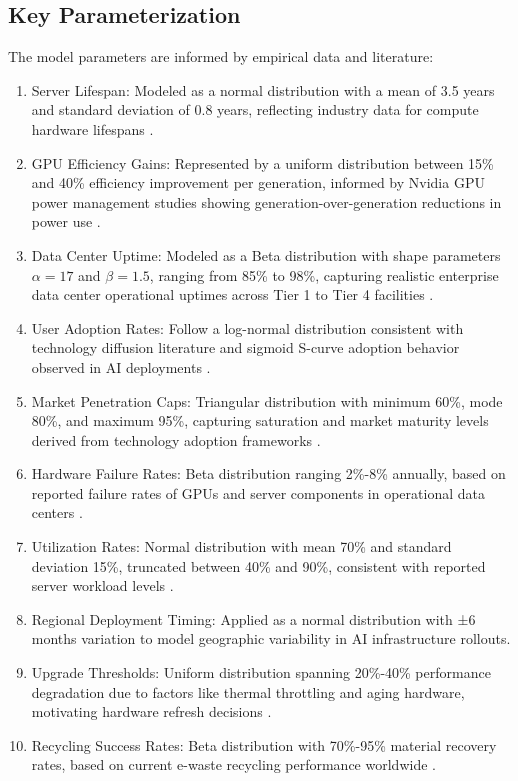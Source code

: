 \documentclass[a4paper, 12pt]{article}
\begin{document}
\subsection{Key Parameterization}
The model parameters are informed by empirical data and literature:

\begin{enumerate}
    \item Server Lifespan: Modeled as a normal distribution with a mean of 3.5 years and standard deviation of 0.8 years, reflecting industry data for compute hardware lifespans \citep{wang_2024_ewaste}.
    \item GPU Efficiency Gains: Represented by a uniform distribution between 15\% and 40\% efficiency improvement per generation, informed by Nvidia GPU power management studies showing generation-over-generation reductions in power use \citep{nvidia-2023, you-2023}.
    \item Data Center Uptime: Modeled as a Beta distribution with shape parameters $\alpha=17$ and $\beta=1.5$, ranging from 85\% to 98\%, capturing realistic enterprise data center operational uptimes across Tier 1 to Tier 4 facilities \citep{unknown-author-no-date, operations-2024}.
    \item User Adoption Rates: Follow a log-normal distribution consistent with technology diffusion literature and sigmoid S-curve adoption behavior observed in AI deployments \citep{operations-2024, pamplona-2024}.
    \item Market Penetration Caps: Triangular distribution with minimum 60\%, mode 80\%, and maximum 95\%, capturing saturation and market maturity levels derived from technology adoption frameworks \citep{fordyce-2025}.
    \item Hardware Failure Rates: Beta distribution ranging 2\%-8\% annually, based on reported failure rates of GPUs and server components in operational data centers \citep{wang_2024_ewaste}.
    \item Utilization Rates: Normal distribution with mean 70\% and standard deviation 15\%, truncated between 40\% and 90\%, consistent with reported server workload levels \citep{wang_2024_ewaste}.
    \item Regional Deployment Timing: Applied as a normal distribution with ±6 months variation to model geographic variability in AI infrastructure rollouts.
    \item Upgrade Thresholds: Uniform distribution spanning 20\%-40\% performance degradation due to factors like thermal throttling and aging hardware, motivating hardware refresh decisions \citep{you-2023}.
    \item Recycling Success Rates: Beta distribution with 70\%-95\% material recovery rates, based on current e-waste recycling performance worldwide \citep{wang_2024_ewaste}.
\end{enumerate}
\end{document}
